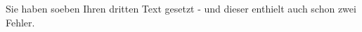 \documentclass{article}
\begin{document}
Sie haben soeben Ihren dritten Text gesetzt - und dieser enthielt auch schon zwei Fehler.
\end{document}
